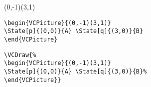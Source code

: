 \documentclass[11pt,twoside]{article}
\newlength{\parindenttemp} %
\newcommand{\medskipneg}{\vspace*{-2ex}} %
\newcommand{\noi}{\noindent}
\newlength{\jsIndent}%
\newlength{\ColSource}%
\newlength{\ColFigur}%
\begin{document}
\ShowFrame
\noi 
\hspace*{-\jsIndent}
\begin{minipage}[t]{\ColFigur}%
\par\vspace*{0mm}%
\medskipneg 
\begin{center}
\begin{VCPicture}{(0,-1)(3,1)}
\end{VCPicture}%
\end{center}
\end{minipage}%
\hspace*{1.2em}%
\begin{minipage}[t]{\ColSource}
\setlength{\parindent}{\parindenttemp}%
\par\vspace*{0mm}%
\footnotesize
\begin{verbatim}
\begin{VCPicture}{(0,-1)(3,1)}
\State[p]{(0,0)}{A} \State[q]{(3,0)}{B}
\end{VCPicture}
\end{verbatim}
\normalsize
\end{minipage}%

\noi 
\hspace*{-\jsIndent}
\begin{minipage}[t]{\ColFigur}%
\par\vspace*{0mm}%
\medskip 
\begin{center}
%
\end{center}
\end{minipage}%
\hspace*{1.2em}%
\begin{minipage}[t]{\ColSource}
\setlength{\parindent}{\parindenttemp}%
\par\vspace*{0mm}%
\footnotesize
\begin{verbatim}
\VCDraw{%
\begin{VCPicture}{(0,-1)(3,1)}
\State[p]{(0,0)}{A} \State[q]{(3,0)}{B}%
\end{VCPicture}}
\end{verbatim}
\normalsize
\end{minipage}%
\end{document}

